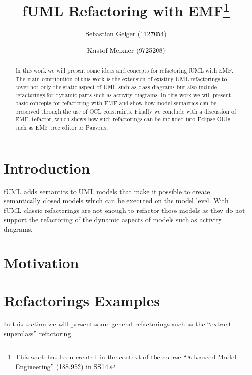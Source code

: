 \documentclass{llncs}
\begin{document}
\pagestyle{plain}

\title{fUML Refactoring with EMF\footnote{This work has been created in the context of the course ``Advanced Model Engineering'' (188.952) in SS14.}}

\author{Sebastian Geiger (1127054) \and Kristof Meixner (9725208)}

\maketitle

\begin{abstract}
In this work we will present some ideas and concepts for refactoring fUML with EMF. The main contribution of this work is the extension of
existing UML refactorings to cover not only the static aspect of UML such as class diagrams but also include refactorings for dynamic
parts such as activity diagrams. In this work we will present basic concepts for refactoring with EMF and show how model semantics can be
preserved through the use of OCL constraints. Finally we conclude with a discussion of EMF.Refactor, which shows how such refactorings
can be included into Eclipse GUIs such as EMF tree editor or Papyrus.
\end{abstract}

\tableofcontents
\newpage


\section{Introduction}
fUML adds semantics to UML models that make it possible to create semantically closed models which can be executed on the model level. With
fUML classic refactorings are not enough to refactor those models as they do not support the refactoring of the dynamic aspects of models
such as activity diagrams.

\section{Motivation}


\section{Refactorings Examples}
In this section we will present some general refactorings such as the ``extract superclass'' refactoring.
\end{document}
